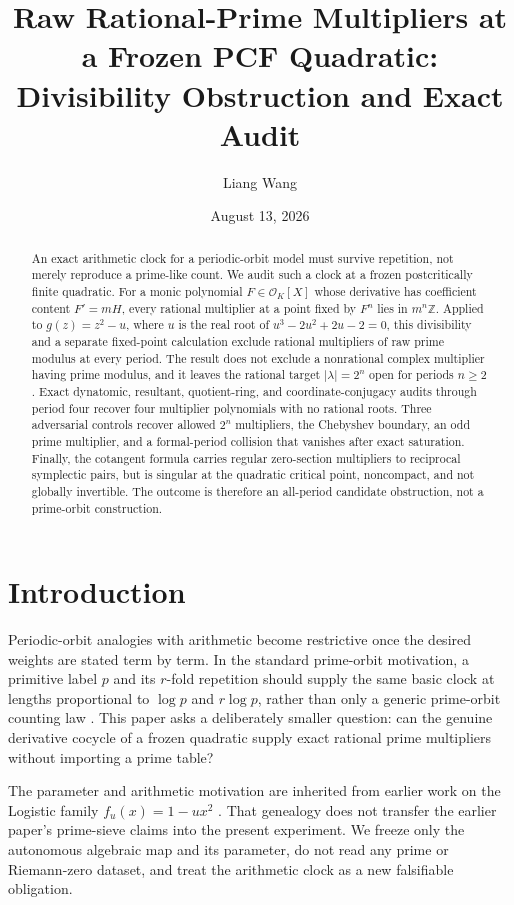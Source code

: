 \documentclass[11pt]{article}
\title{Raw Rational-Prime Multipliers at a Frozen PCF Quadratic:\\
Divisibility Obstruction and Exact Audit}
\author{Liang Wang}
\date{August 13, 2026}
\theoremstyle{remark}
\begin{document}
\maketitle

\begin{abstract}
An exact arithmetic clock for a periodic-orbit model must survive repetition,
not merely reproduce a prime-like count.  We audit such a clock at a frozen
postcritically finite quadratic.  For a monic polynomial
\(F\in\mathcal O_K[X]\) whose derivative has coefficient content
\(F'=mH\), every rational multiplier at a point fixed by \(F^n\) lies in
\(m^n\mathbb Z\).  Applied to \(g(z)=z^2-u\), where \(u\) is the real root of
\(u^3-2u^2+2u-2=0\), this divisibility and a separate fixed-point calculation
exclude rational multipliers of raw prime modulus at every period.  The result
does not exclude a nonrational complex multiplier having prime modulus, and it
leaves the rational target \(|\lambda|=2^n\) open for periods \(n\ge2\).
Exact dynatomic, resultant, quotient-ring, and coordinate-conjugacy audits
through period four recover four multiplier polynomials with no rational
roots.  Three adversarial controls recover allowed \(2^n\) multipliers, the
Chebyshev boundary, an odd prime multiplier, and a formal-period collision
that vanishes after exact saturation.  Finally, the cotangent formula carries
regular zero-section multipliers to reciprocal symplectic pairs, but is
singular at the quadratic critical point, noncompact, and not globally
invertible.  The outcome is therefore an all-period candidate obstruction,
not a prime-orbit construction.
\end{abstract}

\section{Introduction}
\label{sec:introduction}

Periodic-orbit analogies with arithmetic become restrictive once the desired
weights are stated term by term.  In the standard prime-orbit motivation, a
primitive label \(p\) and its \(r\)-fold repetition should supply the same
basic clock at lengths proportional to \(\log p\) and \(r\log p\), rather
than only a generic prime-orbit counting law
\citep{berry1999riemann}.  This paper asks a deliberately smaller question:
can the genuine derivative cocycle of a frozen quadratic supply exact rational
prime multipliers without importing a prime table?

The parameter and arithmetic motivation are inherited from earlier work on
the Logistic family \(f_u(x)=1-ux^2\) \citep{wang2026prime}.  That genealogy
does not transfer the earlier paper's prime-sieve claims into the present
experiment.  We freeze only the autonomous algebraic map and its parameter,
do not read any prime or Riemann-zero dataset, and treat the arithmetic clock
as a new falsifiable obligation.
\end{document}

